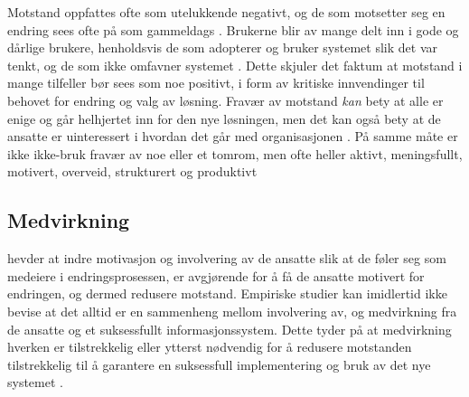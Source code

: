 \noindent
Motstand oppfattes ofte som utelukkende negativt, og de som motsetter seg en endring sees ofte på som gammeldags \citep{Jacobsen12}. Brukerne blir av mange delt inn i gode og  dårlige brukere, henholdsvis de som adopterer og bruker systemet slik det var tenkt, og de som ikke omfavner systemet \citep{Satchell09}. Dette skjuler det faktum at motstand i mange tilfeller bør sees som noe positivt, i form av kritiske innvendinger til behovet for endring og valg av løsning. Fravær av motstand \textit{kan} bety at alle er enige og går helhjertet inn for den nye løsningen, men det kan også bety at de ansatte er uinteressert i hvordan det går med organisasjonen \citep{Jacobsen12}. På samme måte er ikke ikke-bruk fravær av noe eller et tomrom, men ofte heller aktivt, meningsfullt, motivert, overveid, strukturert og produktivt \citep{Satchell09}
 
\subsection{Medvirkning}
\label{sec:medvirkning}
\citet{Jacobsen12} hevder at indre motivasjon og involvering av de ansatte slik at de føler seg som medeiere i endringsprosessen, er avgjørende for å få de ansatte motivert for endringen, og dermed redusere motstand. Empiriske studier kan imidlertid ikke bevise at det alltid er en sammenheng mellom involvering av, og medvirkning fra de ansatte og et suksessfullt informasjonssystem. Dette tyder på at medvirkning hverken er tilstrekkelig eller ytterst nødvendig for å redusere motstanden tilstrekkelig til å garantere en suksessfull implementering og bruk av det nye systemet \citep{Cavaye95}.
 
